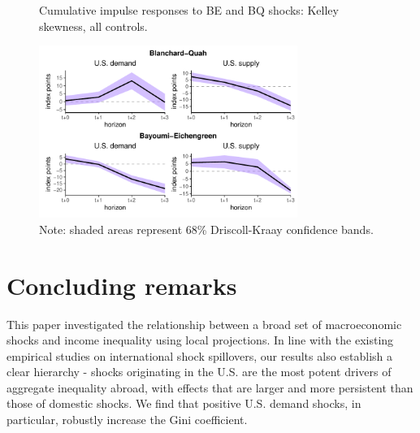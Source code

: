 \documentclass[12pt, a4paper]{article}
\begin{document}
\begin{figure}[H]
    \centering    
    \caption{Cumulative impulse responses to BE and BQ shocks: Kelley skewness, all controls.}  
    \label{fig:bqbe_kelley}
    \includegraphics[width=0.75\textwidth]{Figures/robust_kelley_BQBE_demand_supply_LP.pdf}
    \centering \caption*{Note: shaded areas represent 68\% Driscoll-Kraay confidence bands.}
\end{figure}

\section{Concluding remarks}
This paper investigated the relationship between a broad set of macroeconomic shocks and income inequality using local projections. In line with the existing empirical studies on international shock spillovers, our results also establish a clear hierarchy - shocks originating in the U.S. are the most potent drivers of aggregate inequality abroad, with effects that are larger and more persistent than those of domestic shocks. We find that positive U.S. demand shocks, in particular, robustly increase the Gini coefficient.
\end{document}
